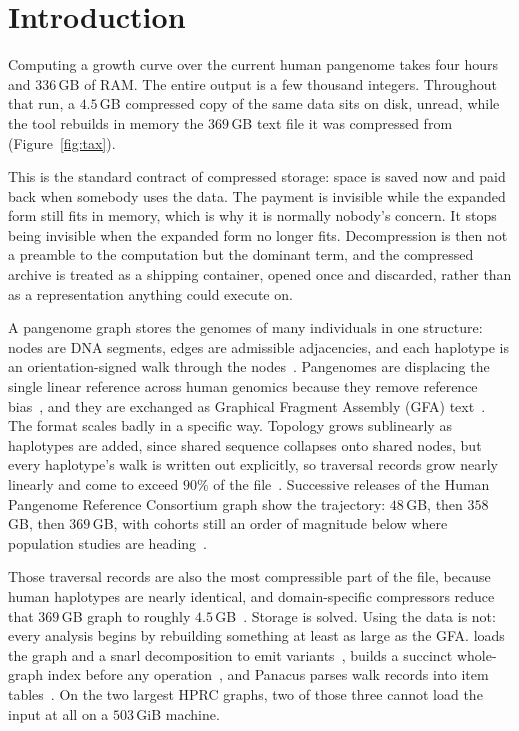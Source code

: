\section{Introduction}
\label{sec:intro}

Computing a growth curve over the current human pangenome takes four hours and
$336$\,GB of RAM. The entire output is a few thousand integers. Throughout that
run, a $4.5$\,GB compressed copy of the same data sits on disk, unread, while the
tool rebuilds in memory the $369$\,GB text file it was compressed from
(Figure~\ref{fig:tax}).

This is the standard contract of compressed storage: space is saved now and paid
back when somebody uses the data. The payment is invisible while the expanded form
still fits in memory, which is why it is normally nobody's concern. It stops being
invisible when the expanded form no longer fits. Decompression is then not a
preamble to the computation but the dominant term, and the compressed archive is
treated as a shipping container, opened once and discarded, rather than as a
representation anything could execute on.



A pangenome graph stores the genomes of many individuals in one structure: nodes
are DNA segments, edges are admissible adjacencies, and each haplotype is an
orientation-signed walk through the
nodes~\cite{eizenga2020pangenome,liao2023draft}. Pangenomes are displacing the
single linear reference across human genomics because they remove reference
bias~\cite{lin2024measuring}, and they are exchanged as Graphical Fragment
Assembly (GFA) text~\cite{gfaspec}. The format scales badly in a specific way.
Topology grows sublinearly as haplotypes are added, since shared sequence
collapses onto shared nodes, but every haplotype's walk is written out
explicitly, so traversal records grow nearly linearly and come to exceed $90\%$ of
the file~\cite{heringer2025human}. Successive releases of the Human Pangenome
Reference Consortium graph show the trajectory: $48$\,GB, then $358$\,GB, then
$369$\,GB, with cohorts still an order of magnitude below where population studies
are heading~\cite{wang2022human}.

Those traversal records are also the most compressible part of the file, because
human haplotypes are nearly identical, and domain-specific compressors reduce that
$369$\,GB graph to roughly
$4.5$\,GB~\cite{siren2022gbz,heringer2025human,gfaz2026}. Storage is solved. Using
the data is not: every analysis begins by rebuilding something at least as large as
the GFA.  loads the graph and a snarl decomposition to emit
variants~\cite{garrison2018variation,hickey2020genotyping},  builds a
succinct whole-graph index before any operation~\cite{guarracino2022odgi}, and
Panacus parses walk records into item tables~\cite{parmigiani2024panacus}. On the
two largest HPRC graphs, two of those three cannot load the input at all on a
$503$\,GiB machine.

